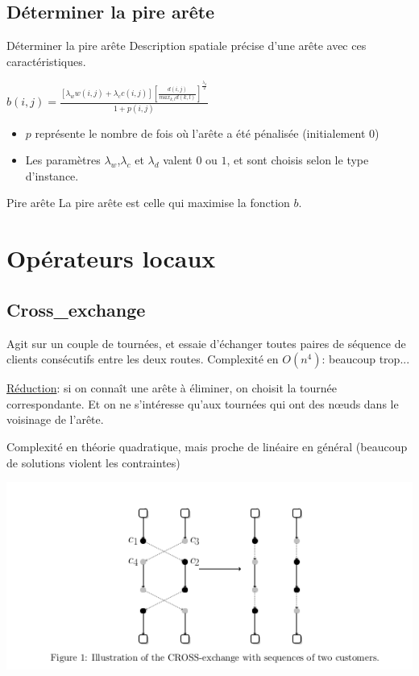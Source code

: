 \documentclass{beamer}
\begin{document}
\subsection{Déterminer la pire arête}

\begin{frame}{Déterminer la pire arête}
Description spatiale précise d'une arête avec ces caractéristiques. 
\begin{center}
$b(i,j) = \frac{[\lambda_w w(i,j) + \lambda_c c(i,j)] [\frac{d(i,j)}{max_{k,l}d(k,l)}] ^ {\frac{\lambda_d}{2}}}{1+p(i,j)}$
\end{center}

\begin{itemize}
\item $p$ représente le nombre de fois où l'arête a été pénalisée (initialement 0)

\item Les paramètres $\lambda_w$,$\lambda_c$ et $\lambda_d$ valent $0$ ou $1$, et sont choisis selon le type d'instance.
\end{itemize}

\begin{exampleblock}{Pire arête}
La pire arête est celle qui maximise la fonction $b$.
\end{exampleblock}
\end{frame}

\section{Opérateurs locaux}

\subsection{Cross\_exchange}
\begin{frame}
Agit sur un couple de tournées, et essaie d'échanger toutes paires de séquence de clients consécutifs entre les deux routes. Complexité en $O(n^4)$: beaucoup trop...

\underline{Réduction}: si on connaît une arête à éliminer, on choisit la tournée correspondante. Et on ne s'intéresse qu'aux tournées qui ont des n\oe uds dans le voisinage de l'arête.

Complexité en théorie quadratique, mais proche de linéaire en général (beaucoup de solutions violent les contraintes)

	\centering
	\includegraphics[height=0.4\textheight]{cross_exchange.png}
\end{frame}
\end{document}
